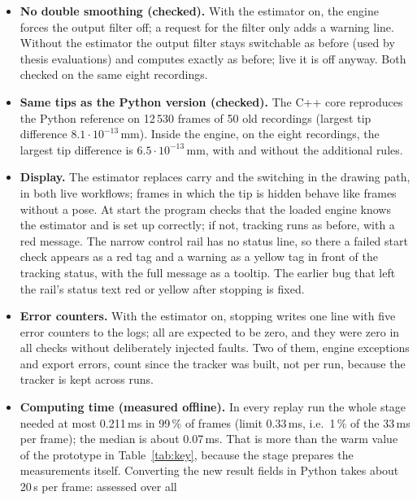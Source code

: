 \documentclass[11pt,a4paper,fleqn]{article}
\begin{document}
\begin{itemize}
        previous engine build also needs the switch set to \texttt{False}; otherwise every start reports that the
        estimator stays off (the live display in red) and tracking runs as with the switch off.
  \item \textbf{No double smoothing (checked).} With the estimator on, the engine forces the output filter off; a
        request for the filter only adds a warning line. Without the estimator the output filter stays switchable as
        before (used by thesis evaluations) and computes exactly as before; live it is off anyway. Both checked on the
        same eight recordings.
  \item \textbf{Same tips as the Python version (checked).} The C++ core reproduces the Python reference on
        12\,530 frames of 50 old recordings (largest tip difference $8.1\cdot10^{-13}$\,mm). Inside the engine, on
        the eight recordings, the largest tip difference is $6.5\cdot10^{-13}$\,mm, with and without the additional
        rules.
  \item \textbf{Display.} The estimator replaces carry and the switching in the drawing path, in both live workflows;
        frames in which the tip is hidden behave like frames without a pose. At start the program checks that the
        loaded engine knows the estimator and is set up correctly; if not, tracking runs as before, with a red
        message. The narrow control rail has no status line, so there a failed start check appears as a red tag and a
        warning as a yellow tag in front of the tracking status, with the full message as a tooltip. The earlier bug
        that left the rail's status text red or yellow after stopping is fixed.
  \item \textbf{Error counters.} With the estimator on, stopping writes one line with five error counters to the
        logs; all are expected to be zero, and they were zero in all checks without deliberately injected faults. Two
        of them, engine
        exceptions and export errors, count since the tracker was built, not per run, because the tracker is kept
        across runs.
  \item \textbf{Computing time (measured offline).} In every replay run the whole stage needed at most 0.211\,ms in
        99\,\% of frames (limit 0.33\,ms, i.e.\ 1\,\% of the 33\,ms per frame); the median is about 0.07\,ms. That is
        more than the warm value of the prototype in Table~\ref{tab:key}, because the stage prepares the measurements
        itself. Converting the new result fields in Python takes about 20\,\textmu s per frame: assessed over all

\end{itemize}
\end{document}
